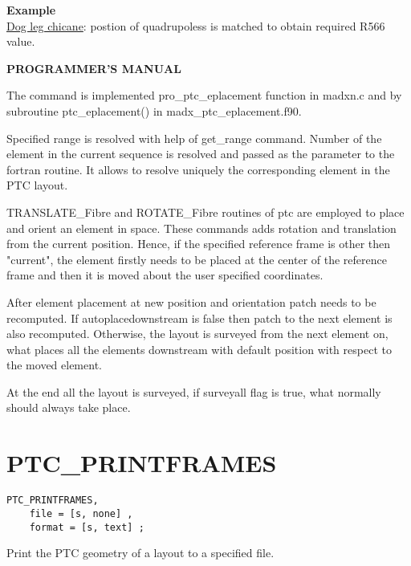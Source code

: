 \textbf{Example }\\

\href{http://cern.ch/frs/mad-X_examples/ptc_madx_interface/eplacement/chicane.madx}{Dog
  leg chicane}: postion of quadrupoless is matched to obtain required
R566 value.   


{\bf PROGRAMMER'S MANUAL}

The command is implemented pro\_ptc\_eplacement function in madxn.c and
by subroutine ptc\_eplacement() in madx\_ptc\_eplacement.f90.  

Specified range is resolved with help of get\_range command. Number of
the element in the current sequence is resolved and passed as the
parameter to the fortran routine. It allows to resolve uniquely the
corresponding element in the PTC layout.  

TRANSLATE\_Fibre and ROTATE\_Fibre routines of ptc are employed to place
and orient an element in space. These commands adds rotation and
translation from the current position. Hence, if the specified reference
frame is other then "current", the element firstly needs to be placed at
the center of the reference frame and then it is moved about the user
specified coordinates.   

After element placement at new position and orientation patch needs to
be recomputed. If autoplacedownstream is false then patch to the next
element is also recomputed. Otherwise, the layout is surveyed from the
next element on, what places all the elements downstream with default
position with respect to the moved element.  

At the end all the layout is surveyed, if surveyall flag is true, what
normally should always take place.      




%

\section{PTC\_PRINTFRAMES}

\begin{verbatim}
PTC_PRINTFRAMES, 
    file = [s, none] ,
    format = [s, text] ; 
\end{verbatim}

Print the PTC geometry of a layout to a specified file.   \\

